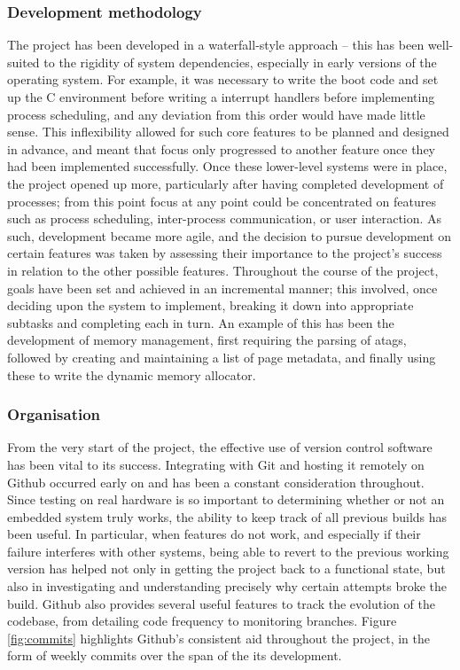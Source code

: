     \subsubsection{Development methodology}
        The project has been developed in a waterfall-style approach -- this has
        been well-suited to the rigidity of system dependencies, especially in
        early versions of the operating system. For example, it was necessary to
        write the boot code and set up the C environment before writing a
        interrupt handlers before implementing process scheduling, and any
        deviation from this order would have made little sense. This
        inflexibility allowed for such core features to be planned and designed
        in advance, and meant that focus only progressed to another feature once
        they had been implemented successfully. Once these lower-level systems
        were in place, the project opened up more, particularly after having
        completed development of processes; from this point focus at any point
        could be concentrated on features such as process scheduling,
        inter-process communication, or user interaction. As such, development
        became more agile, and the decision to pursue development on certain
        features was taken by assessing their importance to the project's
        success in relation to the other possible features. Throughout the
        course of the project, goals have been set and achieved in an
        incremental manner; this involved, once deciding upon the system to
        implement, breaking it down into appropriate subtasks and completing
        each in turn. An example of this has been the development of memory
        management, first requiring the parsing of atags, followed by
        creating and maintaining a list of page metadata, and finally using
        these to write the dynamic memory allocator.

    \subsubsection{Organisation}
        From the very start of the project, the effective use of version control
        software has been vital to its success. Integrating with Git and hosting
        it remotely on Github occurred early on and has been a constant
        consideration throughout. Since testing on real hardware is so important
        to determining whether or not an embedded system truly works, the
        ability to keep track of all previous builds has been useful.  In
        particular, when features do not work, and especially if their failure
        interferes with other systems, being able to revert to the previous
        working version has helped not only in getting the project back to a
        functional state, but also in investigating and understanding precisely
        why certain attempts broke the build. Github also provides several
        useful features to track the evolution of the codebase, from detailing
        code frequency to monitoring branches. Figure \ref{fig:commits}
        highlights Github's consistent aid throughout the project, in the form
        of weekly commits over the span of the its development.

